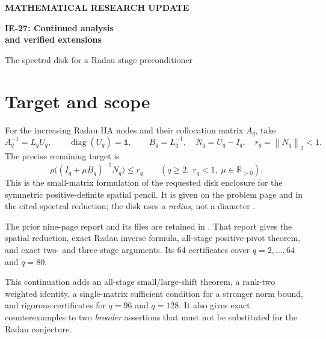 \documentclass[11pt,letterpaper]{article}
\newcommand{\norm}[1]{\left\|#1\right\|_2}
\newcommand{\code}[1]{\texttt{\detokenize{#1}}}
\begin{document}
{\small\sffamily\bfseries\textcolor{ink}{MATHEMATICAL RESEARCH UPDATE}}

{\LARGE\bfseries\textcolor{ink}{IE-27: Continued analysis\\[3pt]and verified extensions}}

{\large The spectral disk for a Radau stage preconditioner}

\vspace{5pt}

\section{Target and scope}
For the increasing Radau IIA nodes and their collocation matrix $A_q$, take
\[
 A_q^{-1}=L_qU_q,\qquad \operatorname{diag}(U_q)=\boldsymbol1,
 \qquad B_q=L_q^{-1},\quad N_q=U_q-I_q,\quad r_q=\norm{N_q}<1.
\]
The precise remaining target is
\begin{equation}\label{eq:target}
 \boxed{\rho\bigl((I_q+\mu B_q)^{-1}N_q\bigr)\le r_q}\qquad
 (q\ge2,\; r_q<1,\; \mu\in\mathbb R_{>0}).
\end{equation}
This is the small-matrix formulation of the requested disk enclosure for the
symmetric positive-definite spatial pencil. It is given on the problem page
and in the cited spectral reduction; the disk uses a \emph{radius}, not a
diameter \cite{problem,outrata}.

The prior nine-page report and its files are retained in
\code{prior_results/}. That report gives the spatial reduction, exact
Radau inverse formula, all-stage positive-pivot theorem, and exact two- and
three-stage arguments. Its 64 certificates cover $q=2,\ldots,64$ and $q=80$.

This continuation adds an all-stage small/large-shift theorem, a rank-two
weighted identity, a single-matrix sufficient condition for a stronger norm
bound, and rigorous certificates for $q=96$ and $q=128$. It also gives exact
counterexamples to two \emph{broader} assertions that must not be substituted
for the Radau conjecture.
\end{document}
